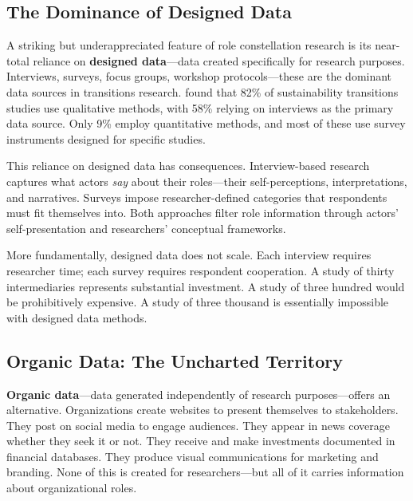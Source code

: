 \documentclass[../main.tex]{subfiles}
\begin{document}
\subsection{The Dominance of Designed Data}

A striking but underappreciated feature of role constellation research is its near-total reliance on \textbf{designed data}---data created specifically for research purposes. Interviews, surveys, focus groups, workshop protocols---these are the dominant data sources in transitions research. \textcite{zolfagharian2019studying} found that 82\% of sustainability transitions studies use qualitative methods, with 58\% relying on interviews as the primary data source. Only 9\% employ quantitative methods, and most of these use survey instruments designed for specific studies.

This reliance on designed data has consequences. Interview-based research captures what actors \emph{say} about their roles---their self-perceptions, interpretations, and narratives. Surveys impose researcher-defined categories that respondents must fit themselves into. Both approaches filter role information through actors' self-presentation and researchers' conceptual frameworks.

More fundamentally, designed data does not scale. Each interview requires researcher time; each survey requires respondent cooperation. A study of thirty intermediaries represents substantial investment. A study of three hundred would be prohibitively expensive. A study of three thousand is essentially impossible with designed data methods.

\subsection{Organic Data: The Uncharted Territory}

\textbf{Organic data}---data generated independently of research purposes---offers an alternative. Organizations create websites to present themselves to stakeholders. They post on social media to engage audiences. They appear in news coverage whether they seek it or not. They receive and make investments documented in financial databases. They produce visual communications for marketing and branding. None of this is created for researchers---but all of it carries information about organizational roles.
\end{document}
